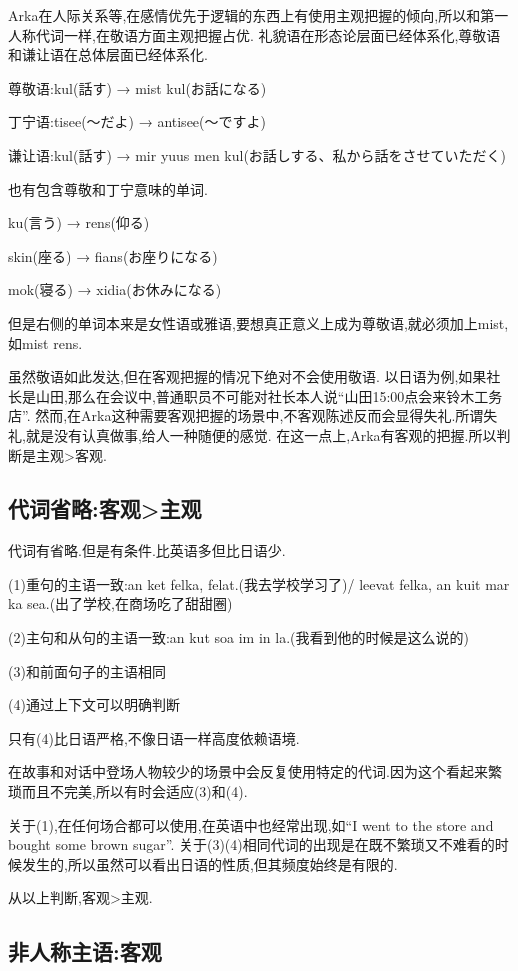 Arka在人际关系等,在感情优先于逻辑的东西上有使用主观把握的倾向,所以和第一人称代词一样,在敬语方面主观把握占优.
礼貌语在形态论层面已经体系化,尊敬语和谦让语在总体层面已经体系化.
{\kaishu

尊敬语:kul(話す) → mist kul(お話になる)

丁宁语:tisee(～だよ) → antisee(～ですよ)

谦让语:kul(話す) → mir yuus men kul(お話しする、私から話をさせていただく)
}

也有包含尊敬和丁宁意味的单词.
{\kaishu

ku(言う) → rens(仰る)

skin(座る) → fians(お座りになる)

mok(寝る) → xidia(お休みになる)
}

但是右侧的单词本来是女性语或雅语,要想真正意义上成为尊敬语,就必须加上mist,如mist rens.

虽然敬语如此发达,但在客观把握的情况下绝对不会使用敬语.
以日语为例,如果社长是山田,那么在会议中,普通职员不可能对社长本人说“山田15:00点会来铃木工务店”.
然而,在Arka这种需要客观把握的场景中,不客观陈述反而会显得失礼.所谓失礼,就是没有认真做事,给人一种随便的感觉.
在这一点上,Arka有客观的把握.所以判断是主观>客观.

\subsection{代词省略:客观>主观}

代词有省略.但是有条件.比英语多但比日语少.

(1)重句的主语一致:an ket felka, felat.(我去学校学习了)/ leevat felka, an kuit mar ka sea.(出了学校,在商场吃了甜甜圈)

(2)主句和从句的主语一致:an kut soa im in la.(我看到他的时候是这么说的)

(3)和前面句子的主语相同

(4)通过上下文可以明确判断

只有(4)比日语严格,不像日语一样高度依赖语境.

在故事和对话中登场人物较少的场景中会反复使用特定的代词.因为这个看起来繁琐而且不完美,所以有时会适应(3)和(4).

关于(1),在任何场合都可以使用,在英语中也经常出现,如“I went to the store and bought some brown sugar”.
关于(3)(4)相同代词的出现是在既不繁琐又不难看的时候发生的,所以虽然可以看出日语的性质,但其频度始终是有限的.

从以上判断,客观>主观.

\subsection{非人称主语:客观}

